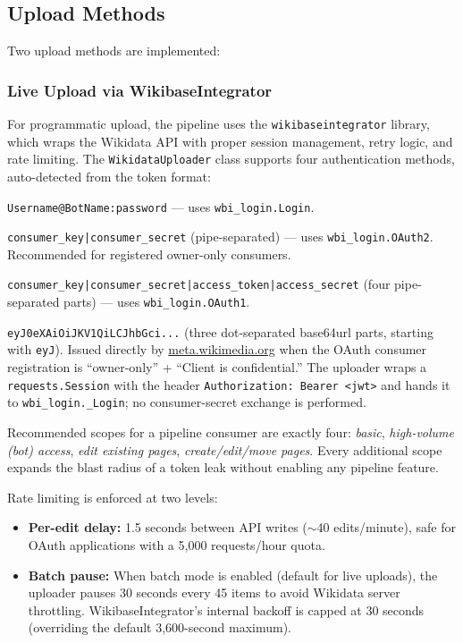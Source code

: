 \documentclass[12pt]{article}
\newcommand{\code}[1]{\texttt{#1}}
\begin{document}
\subsection{Upload Methods}

Two upload methods are implemented:

\subsubsection{Live Upload via WikibaseIntegrator}

For programmatic upload, the pipeline uses the \code{wikibaseintegrator} library, which wraps the Wikidata API with proper session management, retry logic, and rate limiting. The \code{WikidataUploader} class supports four authentication methods, auto-detected from the token format:

\begin{description}[style=nextline, leftmargin=2.5cm]
\item[Bot password] \code{Username@BotName:password} --- uses \code{wbi\_login.Login}.
\item[OAuth 2.0 owner-only] \code{consumer\_key|consumer\_secret} (pipe-separated) --- uses \code{wbi\_login.OAuth2}. Recommended for registered owner-only consumers.
\item[OAuth 1.0a] \code{consumer\_key|consumer\_secret|access\_token|access\_secret} (four pipe-separated parts) --- uses \code{wbi\_login.OAuth1}.
\item[Pre-issued JWT bearer] \code{eyJ0eXAiOiJKV1QiLCJhbGci...} (three dot-separated base64url parts, starting with \code{eyJ}). Issued directly by \url{meta.wikimedia.org} when the OAuth consumer registration is ``owner-only'' + ``Client is confidential.'' The uploader wraps a \code{requests.Session} with the header \code{Authorization: Bearer <jwt>} and hands it to \code{wbi\_login.\_Login}; no consumer-secret exchange is performed.
\end{description}

Recommended scopes for a pipeline consumer are exactly four: \emph{basic}, \emph{high-volume (bot) access}, \emph{edit existing pages}, \emph{create/edit/move pages}. Every additional scope expands the blast radius of a token leak without enabling any pipeline feature.

Rate limiting is enforced at two levels:
\begin{itemize}
\item \textbf{Per-edit delay:} 1.5 seconds between API writes ($\sim$40 edits/minute), safe for OAuth applications with a 5,000 requests/hour quota.
\item \textbf{Batch pause:} When batch mode is enabled (default for live uploads), the uploader pauses 30 seconds every 45 items to avoid Wikidata server throttling. WikibaseIntegrator's internal backoff is capped at 30 seconds (overriding the default 3,600-second maximum).
\end{itemize}
\end{document}
